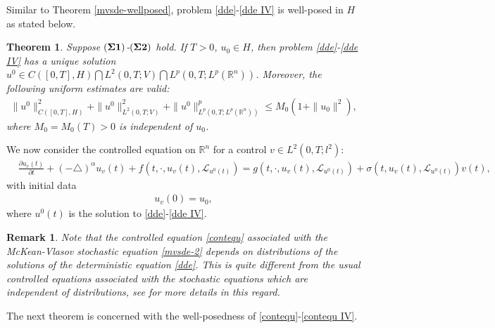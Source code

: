 \documentclass[11pt]{article}
\numberwithin{equation}{section}
\theoremstyle{plain}
\newtheorem{theorem}{Theorem}[section]
\newtheorem{remark}{Remark}[section]
\def\leq{\leqslant}
\begin{document}
Similar to
 Theorem \ref{mvsde-wellposed},
 problem   \eqref{dde}-\eqref{dde IV}
 is well-posed in $H$ as stated below.


\begin{theorem} \label{dde-wellposed}
  Suppose $({\bf \Sigma 1})$-$({\bf \Sigma 2})$ hold.
  If $T>0$, $u_0 \in H$,
  then problem \eqref{dde}-\eqref{dde IV} has a unique solution
    $u^0 \in C([0,T], H)
             \bigcap
             L^2(0,T; V)
             \bigcap
             L^p(0,T; L^p(\mathbb{R}^n ) )$.
 Moreover, the following uniform estimates are valid:
 \begin{align*}
           \| u^0 \|_{C([0,T], H)}^2
           + \| u^0 \|_{L^2(0,T; V)}^2
           + \| u^0 \|_{L^p(0,T; L^p(\mathbb{R}^n ) )}^p
      \leq M_0 \left( 1 + \| u_0 \|^2 \right),
 \end{align*}
 where $M_0 = M_0(T) > 0$ is independent of   $u_0$.
\end{theorem}


We now
 consider the controlled equation on $\mathbb{R}^n$
 for   a control $v \in L^2(0,T; l^2)$:
\begin{align}\label{contequ}
      & \frac{\partial u_v (t)}{\partial t}
        + (-\triangle)^\alpha u_v (t)
        + f(t, \cdot,  u_v(t), \mathcal{L}_{u^0(t)} )
    =  g(t, \cdot, u_v(t), \mathcal{L}_{u^0(t)} )
        + \sigma(t, u_v (t), \mathcal{L}_{u^0(t)}) v(t),
\end{align}
 with initial data
 \begin{align}\label{contequ IV}
       u_v(0) = u_0,
 \end{align}
 where $u^0(t)$ is the solution to \eqref{dde}-\eqref{dde IV}.

\begin{remark}
  Note that the controlled equation
  \eqref{contequ}  associated with
  the  McKean-Vlasov stochastic
  equation \eqref{mvsde-2}
   depends on distributions of
   the solutions of the deterministic equation \eqref{dde}.
  This  is quite  different from the usual controlled equations associated with  the   stochastic equations
  which are independent of    distributions,
  see  \cite[Remark 2.2]{hll2021AMO}
  for more details in this regard.
\end{remark}


The next theorem is concerned
with the   well-posedness of
 \eqref{contequ}-\eqref{contequ IV}.
\end{document}
